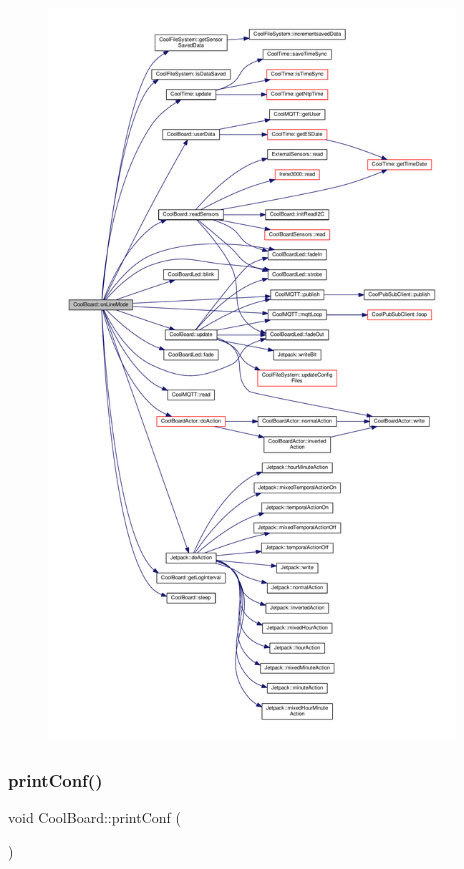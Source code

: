 \begin{figure}[H]
\begin{center}
\leavevmode
\includegraphics[height=550pt]{d7/df9/class_cool_board_aa0bbc4bc605e35618d18e68795c61363_cgraph}
\end{center}
\end{figure}
\mbox{\label{class_cool_board_a486507b8f0981d3cc671ed31c2145755}} 
\subsubsection{\texorpdfstring{print\+Conf()}{printConf()}}
{\footnotesize\ttfamily void Cool\+Board\+::print\+Conf (\begin{DoxyParamCaption}{ }\end{DoxyParamCaption})}

